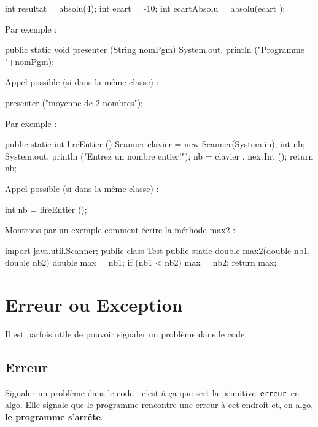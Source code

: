 \documentclass[11pt,a4paper]{article}
\begin{document}
            \par
        \begin{Java}

int resultat = absolu(4);
int ecart = -10;
int ecartAbsolu = absolu(ecart );
				\end{Java}Par exemple : 
            \par
        \begin{Java}

public static void presenter (String nomPgm) {
    System.out. println ("Programme "+nomPgm);
}				\end{Java}
        Appel possible (si dans la m\^eme classe) :
      
            \par
        \begin{Java}

presenter ("moyenne de 2 nombres");
				\end{Java}Par exemple : 
            \par
        \begin{Java}

public static int lireEntier () {
    Scanner clavier = new Scanner(System.in);
    int nb;
    System.out. println ("Entrez un nombre entier!");
    nb = clavier . nextInt ();
    return nb;
}				\end{Java}
        Appel possible (si dans la m\^eme classe) :
      
            \par
        \begin{Java}

int nb = lireEntier ();
				\end{Java}Montrons par un exemple comment \'ecrire la m\'ethode max2 : 
            \par
        \begin{Java}

import java.util.Scanner;
public class Test{
  public static double max2(double nb1, double nb2){
    double max = nb1;
		if (nb1 < nb2) {
			max = nb2;
		}
		return max;
  }
}				\end{Java}\section{Erreur ou Exception}
          Il est parfois utile de pouvoir signaler un probl\`eme dans le code. 
        
            \par
        \subsection{Erreur}
          Signaler un probl\`eme dans le code : c'est \`a \c ca que sert la primitive \,\verb|erreur|\, en algo.
          Elle signale que le programme rencontre une erreur \`a cet endroit et, en algo, 
          \textbf{le programme s'arr\^ete}.
      
\end{document}
